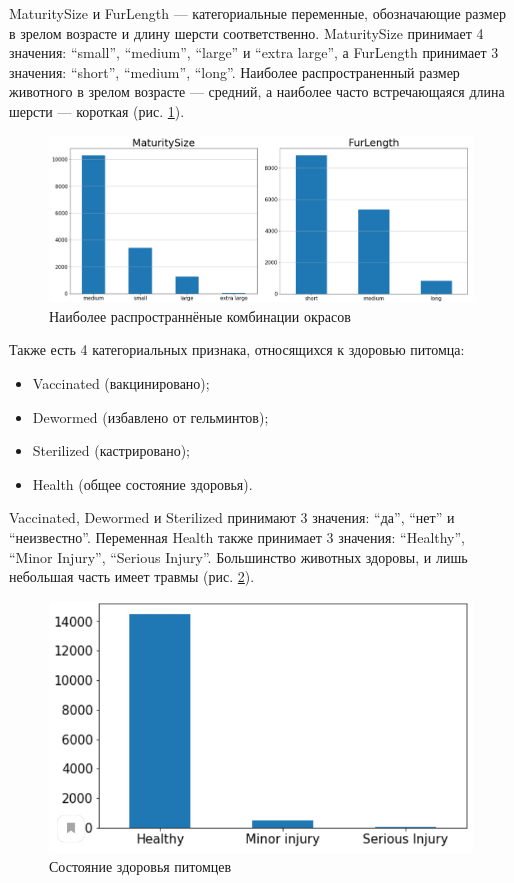 \documentclass[14pt]{mmcs_article}
\begin{document}
MaturitySize и FurLength --- категориальные переменные, обозначающие размер в зрелом возрасте и длину шерсти соответственно. MaturitySize принимает 4 значения: ``small'', ``medium'', ``large'' и ``extra large'', а FurLength принимает 3 значения: ``short'', ``medium'', ``long''. Наиболее распространенный размер животного в зрелом возрасте --- средний, а наиболее часто встречающаяся длина шерсти --- короткая (рис. \ref{analyse:sizelength}).

\begin{figure}[H]
	\centering
	\includegraphics[scale=0.4]{sizelength.png}
	\caption{Наиболее распространнёные комбинации окрасов}\label{analyse:sizelength}
\end{figure}

Также есть 4 категориальных признака, относящихся к здоровью питомца: 

\begin{itemize}
	\item Vaccinated (вакцинировано);
	\item Dewormed (избавлено от гельминтов);
	\item Sterilized (кастрировано);
	\item Health (общее состояние здоровья).
\end{itemize}

Vaccinated, Dewormed и Sterilized принимают 3 значения: ``да'', ``нет'' и ``неизвестно''. Переменная Health также принимает 3 значения: ``Healthy'', ``Minor Injury'', ``Serious Injury''. Большинство животных здоровы, и лишь небольшая часть имеет травмы (рис. \ref{analyse:health}).

\begin{figure}[H]
	\centering
	\includegraphics[scale=0.9]{health.png}
	\caption{Состояние здоровья питомцев}\label{analyse:health}
\end{figure}
\end{document}
